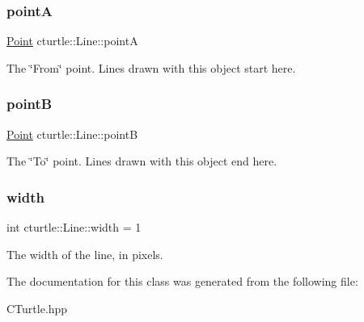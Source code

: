 \subsubsection{\texorpdfstring{pointA}{pointA}}
{\footnotesize\ttfamily \hyperlink{structcturtle_1_1ivec2}{Point} cturtle\+::\+Line\+::pointA}

The \char`\"{}\+From\char`\"{} point. Lines drawn with this object start here. \mbox{\label{classcturtle_1_1Line_a138b108f3a3531c4f7f72a8e26a16fcf}} 
\subsubsection{\texorpdfstring{pointB}{pointB}}
{\footnotesize\ttfamily \hyperlink{structcturtle_1_1ivec2}{Point} cturtle\+::\+Line\+::pointB}

The \char`\"{}\+To\char`\"{} point. Lines drawn with this object end here. \mbox{\label{classcturtle_1_1Line_ae0c426af211fc443b7ad2bed4c30050b}} 
\subsubsection{\texorpdfstring{width}{width}}
{\footnotesize\ttfamily int cturtle\+::\+Line\+::width = 1}

The width of the line, in pixels. 

The documentation for this class was generated from the following file\+:\begin{DoxyCompactItemize}
\item 
C\+Turtle.\+hpp\end{DoxyCompactItemize}
